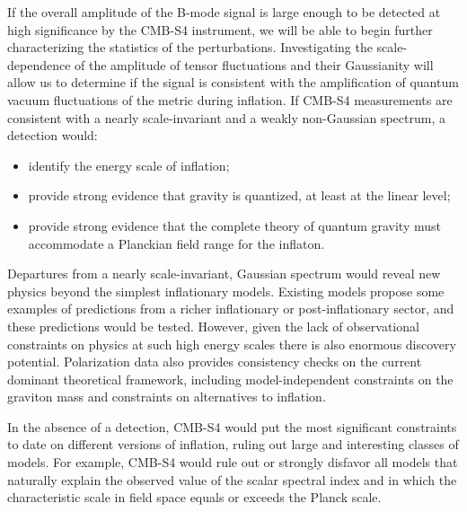 If the overall amplitude of the B-mode signal is large enough to be detected at high significance by the CMB-S4 instrument, we will be able to begin further characterizing the statistics of the perturbations. Investigating the scale-dependence of the amplitude of tensor fluctuations and their Gaussianity will allow us to determine if the signal is consistent with the amplification of quantum vacuum fluctuations of the metric during inflation. If CMB-S4 measurements are consistent with a nearly scale-invariant and a weakly non-Gaussian spectrum, a detection would:
\begin{itemize}
 \item identify the energy scale of inflation;
 \item provide strong evidence that gravity is quantized, at least at the linear level;
 \item provide strong evidence that the complete theory of quantum gravity must accommodate a Planckian field range for the inflaton.
\end{itemize}

Departures from a nearly scale-invariant, Gaussian spectrum would reveal new physics beyond the simplest inflationary models. Existing models propose some examples of predictions from a richer inflationary or post-inflationary sector, and these predictions would be tested. However, given the lack of observational constraints on physics at such high energy scales there is also enormous discovery potential. Polarization data also provides consistency checks on the current dominant theoretical framework, including model-independent constraints on the graviton mass and constraints on alternatives to inflation.

In the absence of a detection, CMB-S4 would put the most significant constraints to date on different versions of inflation, ruling out large and interesting classes of models. For example, CMB-S4 would rule out or strongly disfavor all models that naturally explain the observed value of the scalar spectral index and in which the characteristic scale in field space equals or exceeds the Planck scale. 


